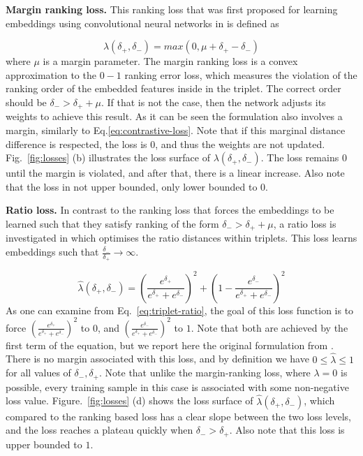 \textbf{Margin ranking loss.}
This ranking loss that was first proposed for learning embeddings using
convolutional neural networks in
\cite{DBLP:journals/corr/WangSLRWPCW14} is defined as
 
\begin{equation}
  \label{eq:triplet-margin}
  \lambda(\delta_+,\delta_-) = max(0, \mu
		+\delta_+-\delta_-) 
\end{equation}
where $\mu$ is a margin parameter.  The margin ranking loss is a
convex approximation to the $0-1$ ranking error loss, which measures
the violation of the ranking order of the embedded features inside in
the triplet. The correct order should be
$\delta_{-} > \delta_{+} + \mu$. If that is not the case, then the
network adjusts its weights to achieve this result. As it can be seen
the formulation also involves a margin, similarly to
Eq.\eqref{eq:contrastive-loss}. Note that if this marginal distance
difference is respected, the loss is 0, and thus the weights are not
updated. Fig.~\ref{fig:losses} (b) illustrates the loss surface of
$\lambda(\delta_+,\delta_-)$. The loss remains 0 until the margin is
violated, and after that, there is a linear increase. Also note that
the loss in not upper bounded, only lower bounded to 0.

\textbf{Ratio loss.} In contrast to the ranking loss that forces the embeddings to be learned such that they satisfy ranking of the form
$\delta_{-}>\delta_{+}+\mu$, a ratio loss is investigated in
\cite{DBLP:journals/corr/HofferA14} which optimises the ratio
distances within triplets. This loss learns embeddings such that
$\frac{\delta_{-}}{\delta_{+}}\rightarrow \infty$.

\begin{equation}
  \label{eq:triplet-ratio}
  \hat{\lambda}(\delta_+,\delta_-) = (\frac{e^{\delta_+}}{e^{\delta_+}+e^{\delta_-}})^2+(1-\frac{e^{\delta_-}}{e^{\delta_+}+e^{\delta_-}})^{2}
\end{equation}
As one can examine from Eq.~\ref{eq:triplet-ratio}, the goal of this
loss function is to force
$(\frac{e^{\delta_+}}{e^{\delta_+}+e^{\delta_-}})^2$ to $0$, and
$(\frac{e^{\delta_-}}{e^{\delta_+}+e^{\delta_-}})^2$ to $1$. Note that
both are achieved by the first term of the equation, but we
report here the original formulation from
\cite{DBLP:journals/corr/HofferA14}.  There is no margin associated
with this loss, and by definition we have
$0 \leq \hat{\lambda} \leq 1$ for all values of
$\delta_{-},\delta_{+}$.  Note that unlike the margin-ranking loss,
where $\lambda=0$ is possible, every training sample in this case is
associated with some non-negative loss value. Figure.~\ref{fig:losses}
(d) shows the loss surface of $\hat{\lambda}(\delta_+,\delta_-)$,
which compared to the ranking based loss has a clear slope between the
two loss levels, and the loss reaches a plateau quickly when
$\delta_{-} > \delta_{+}$. Also note that this loss is upper bounded
to $1$.

